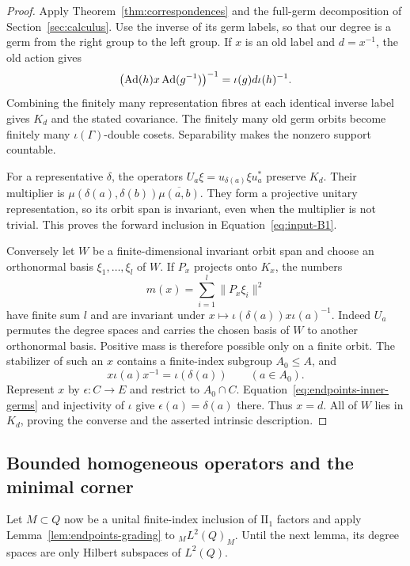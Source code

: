 \begin{proof}
Apply Theorem~\ref{thm:correspondences} and the full-germ decomposition
of Section~\ref{sec:calculus}.  Use the inverse of its germ labels, so
that our degree is a germ from the right group to the left group.
If \(x\) is an old label and \(d=x^{-1}\), the old action gives
\[
 \bigl(\operatorname{Ad}(h)x\operatorname{Ad}(g^{-1})\bigr)^{-1}
 =\iota(g)d\iota(h)^{-1}.
\]
Combining the finitely many representation fibres at each identical
inverse label gives \(K_d\) and the stated covariance. The finitely
many old germ orbits become finitely many
\(\iota(\Gamma)\)-double cosets. Separability makes the nonzero
support countable.

For a representative \(\delta\), the operators
\(U_a\xi=u_{\delta(a)}\xi u_a^*\) preserve \(K_d\).
Their multiplier is
\(\mu(\delta(a),\delta(b))\overline{\mu(a,b)}\).
They form a projective unitary representation, so its orbit span is
invariant, even when the multiplier is not trivial.  This proves the
forward inclusion in Equation~\eqref{eq:input-B1}.

Conversely let \(W\) be a finite-dimensional invariant orbit span and
choose an orthonormal basis \(\xi_1,\ldots,\xi_l\) of \(W\).
If \(P_x\) projects onto \(K_x\), the numbers
\[
 m(x)=\sum_{i=1}^l\|P_x\xi_i\|^2
\]
have finite sum \(l\) and are invariant under
\(x\mapsto\iota(\delta(a))x\iota(a)^{-1}\).
Indeed \(U_a\) permutes the degree spaces and carries the chosen basis
of \(W\) to another orthonormal basis.  Positive mass is therefore
possible only on a finite orbit.  The stabilizer of such an \(x\)
contains a finite-index subgroup \(A_0\leq A\), and
\[
 x\iota(a)x^{-1}=\iota(\delta(a))\qquad(a\in A_0).
\]
Represent \(x\) by \(\epsilon:C\to E\) and restrict to
\(A_0\cap C\).  Equation~\eqref{eq:endpoints-inner-germs} and
injectivity of \(\iota\) give \(\epsilon(a)=\delta(a)\) there.
Thus \(x=d\).  All of \(W\) lies in \(K_d\), proving the converse
and the asserted intrinsic description.
\end{proof}

\subsection{Bounded homogeneous operators and the minimal corner}

Let \(M\subset Q\) now be a unital finite-index inclusion of
\(\mathrm{II}_1\) factors and apply Lemma~\ref{lem:endpoints-grading}
to \({}_M L^2(Q)_M\).  Until the next lemma, its degree spaces are only
Hilbert subspaces of \(L^2(Q)\).

